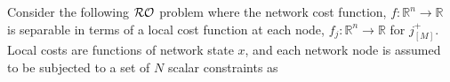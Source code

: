 \documentclass[journal,twoside,web]{ieeecolor}
\begin{document}

Consider the following ${\cal RO}$ problem where the network cost function, $f:\mathbb{R}^n\to \mathbb{R}$ is separable in terms of a local cost function at each node, $f_j:\mathbb{R}^n\to \mathbb{R}$ for $j^+_{[M]}$. Local costs are functions of network state $x$, and each network node is assumed to be subjected to a set of $N$ scalar constraints as%

\end{document}
